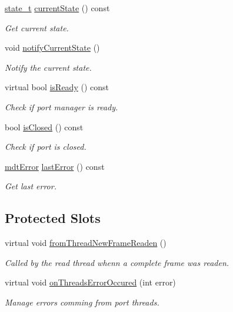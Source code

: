 \begin{DoxyCompactItemize}
\hyperlink{classmdt_port_manager_a9448339d7f08ca5e18b904df25b382da}{state\-\_\-t} \hyperlink{classmdt_port_manager_a59241d9e6b6ee71e6c1aeb3e6c0ca81a}{current\-State} () const 
\begin{DoxyCompactList}\small\item\em Get current state. \end{DoxyCompactList}\item 
void \hyperlink{classmdt_port_manager_a0c460b47b12e38e708321be79f6343d8}{notify\-Current\-State} ()
\begin{DoxyCompactList}\small\item\em Notify the current state. \end{DoxyCompactList}\item 
virtual bool \hyperlink{classmdt_port_manager_a6dc2798324521d177fb8f79d4f6c5f0f}{is\-Ready} () const 
\begin{DoxyCompactList}\small\item\em Check if port manager is ready. \end{DoxyCompactList}\item 
bool \hyperlink{classmdt_port_manager_aeecbec49376838ab3547729636166d97}{is\-Closed} () const 
\begin{DoxyCompactList}\small\item\em Check if port is closed. \end{DoxyCompactList}\item 
\hyperlink{classmdt_error}{mdt\-Error} \hyperlink{classmdt_port_manager_a16c7ea5d74a8fc9ed065477574ec03c4}{last\-Error} () const 
\begin{DoxyCompactList}\small\item\em Get last error. \end{DoxyCompactList}\end{DoxyCompactItemize}
\subsection*{Protected Slots}
\begin{DoxyCompactItemize}
\item 
virtual void \hyperlink{classmdt_port_manager_a4fcc8f0699b655156e661bb3de6056cc}{from\-Thread\-New\-Frame\-Readen} ()
\begin{DoxyCompactList}\small\item\em Called by the read thread whenn a complete frame was readen. \end{DoxyCompactList}\item 
virtual void \hyperlink{classmdt_port_manager_a7e45b8e3475e5182ed12218616664d07}{on\-Threads\-Error\-Occured} (int error)
\begin{DoxyCompactList}\small\item\em Manage errors comming from port threads. \end{DoxyCompactList}\end{DoxyCompactItemize}
